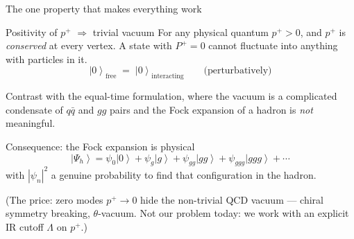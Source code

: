 \documentclass[9pt,aspectratio=169]{beamer}
\newcommand{\hl}[1]{\textcolor{acc}{#1}}
\newcommand{\pp}{p^{+}}
\newcommand{\ket}[1]{\left|#1\right\rangle}
\begin{document}
\begin{frame}{The one property that makes everything work}
\begin{alertblock}{Positivity of $\pp$ $\Rightarrow$ trivial vacuum}
For any physical quantum $\pp>0$, and $\pp$ is \emph{conserved} at every vertex.
A state with $P^{+}=0$ cannot fluctuate into anything with particles in it.
\[
\ket{0}_{\text{free}} \;=\; \ket{0}_{\text{interacting}} \qquad\text{(perturbatively)}
\]
\end{alertblock}
\medskip
Contrast with the equal-time formulation, where the vacuum is a complicated
condensate of $q\bar q$ and $gg$ pairs and the Fock expansion of a hadron is
\emph{not} meaningful.
\medskip
\begin{block}{Consequence: the Fock expansion is physical}
\[
\ket{\Psi_{h}} = \psi_{0}\ket{0} + \psi_{g}\ket{g} + \psi_{gg}\ket{gg}+\psi_{ggg}\ket{ggg}+\cdots
\]
with $|\psi_{n}|^{2}$ a genuine \hl{probability} to find that configuration in the hadron.
\end{block}
\medskip
{\small (The price: zero modes $\pp\!\to\!0$ hide the non-trivial QCD vacuum ---
chiral symmetry breaking, $\theta$-vacuum. Not our problem today: we work with
an explicit IR cutoff $\Lambda$ on $\pp$.)}
\end{frame}
\end{document}
